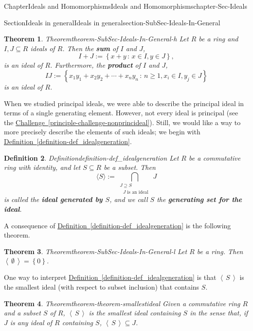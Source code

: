 \documentclass[oneside,10pt,]{book}
\newcommand{\xreffont}{\relax}
\newcommand{\terminology}[1]{\textbf{#1}}
\numberwithin{equation}{section}
\renewcommand{\ge}{\geqslant}
\newcommand{\ideal}[1]{\left\langle\, #1 \,\right\rangle}
\newcommand{\set}[1]{\left\{ {#1} \right\}}
\newcommand{\setof}[2]{{\left\{#1\,\colon\,#2\right\}}}
\newtheorem{theorem}{Theorem}[section]
\newtheorem{definition}[theorem]{Definition}
\begin{document}
\begin{chapterptx}{Chapter}{Ideals and Homomorphisms}{}{Ideals and Homomorphisms}{}{}{chapter-Sec-Ideals}
\begin{sectionptx}{Section}{Ideals in general}{}{Ideals in general}{}{}{section-SubSec-Ideals-In-General}
\begin{theorem}{Theorem}{}{}{theorem-SubSec-Ideals-In-General-h}%
Let \(R\) be a ring and \(I,J\subseteq R\) ideals of \(R\). Then the \terminology{sum} of \(I\) and \(J\),%
\begin{equation*}
I+J := \setof{x+y}{x\in I, y\in J},
\end{equation*}
is an ideal of \(R\). Furthermore, the \terminology{product} of \(I\) and \(J\),%
\begin{equation*}
IJ := \setof{x_1 y_1 + x_2 y_2 + \cdots + x_n y_n}{n\ge 1, x_i \in I, y_j\in J}
\end{equation*}
is an ideal of \(R\).%
\end{theorem}
When we studied principal ideals, we were able to describe the principal ideal in terms of a single generating element. However, not every ideal is principal (see the \hyperref[principle-challenge-nonprincideal]{Challenge~{\xreffont\ref{principle-challenge-nonprincideal}}}). Still, we would like a way to more precisely describe the elements of such ideals; we begin with \hyperref[definition-def_idealgeneration]{Definition~{\xreffont\ref{definition-def_idealgeneration}}}.%
\begin{definition}{Definition}{}{definition-def_idealgeneration}%
Let \(R\) be a commutative ring with identity, and let \(S\subseteq R\) be a subset. Then%
\begin{equation}
\langle S \rangle := \bigcap\limits_{\substack{J\supseteq S\\\text{ \(J\) is an ideal } } } J\label{men-eq_idealgeneratedbyset}
\end{equation}
is called the \terminology{ideal generated by \(S\)}, and we call \(S\) the \terminology{generating set for the ideal}.%
\end{definition}
A consequence of \hyperref[definition-def_idealgeneration]{Definition~{\xreffont\ref{definition-def_idealgeneration}}} is the following theorem.%
\begin{theorem}{Theorem}{}{}{theorem-SubSec-Ideals-In-General-l}%
Let \(R\) be a ring. Then \(\ideal{\emptyset} = \set{0}\).\end{theorem}
One way to interpret \hyperref[definition-def_idealgeneration]{Definition~{\xreffont\ref{definition-def_idealgeneration}}} is that \(\ideal{S}\) is the smallest ideal (with respect to subset inclusion) that contains \(S\).%
\begin{theorem}{Theorem}{}{}{theorem-theorem-smallestideal}%
Given a commutative ring \(R\) and a subset \(S\) of \(R\), \(\ideal{S}\) is the smallest ideal containing \(S\) in the sense that, if \(J\) is any ideal of \(R\) containing \(S\), \(\ideal{S}\subseteq J\).%

\end{theorem}
\end{sectionptx}
\end{chapterptx}
\end{document}
